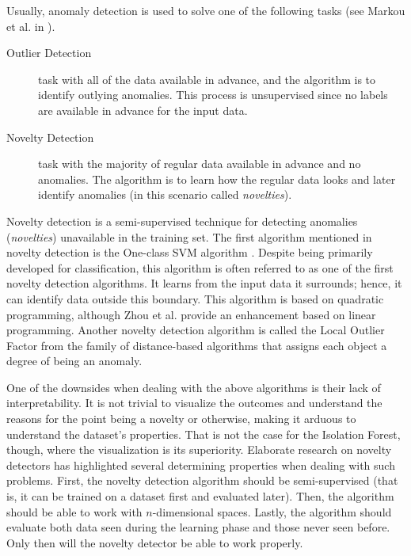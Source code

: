
Usually, anomaly detection is used to solve one of the following tasks (see Markou et al. in \cite{MARKOU20032481}).
\begin{description}
    \item[Outlier Detection]  task with all of the data available in advance, and the algorithm is to identify outlying anomalies. This process is unsupervised since no labels are available in advance for the input data.
    \item[Novelty Detection]  task with the majority of regular data available in advance and no anomalies. The algorithm is to learn how the regular data looks and later identify anomalies (in this scenario called \emph{novelties}).
\end{description}

Novelty detection is a semi-supervised technique for detecting anomalies (\emph{novelties}) unavailable in the training set.
The first algorithm mentioned in novelty detection is the One-class SVM algorithm \cite{tax2004support}. Despite being primarily developed for classification, this algorithm is often referred to as one of the first novelty detection algorithms. It learns from the input data it surrounds; hence, it can identify data outside this boundary.
This algorithm is based on quadratic programming, although Zhou et al. \cite{ZHOU20022927} provide an enhancement based on linear programming.
Another novelty detection algorithm is called the Local Outlier Factor from the family of distance-based algorithms \cite{breunig2000lof} that assigns each object a degree of being an anomaly.



One of the downsides when dealing with the above algorithms is their lack of interpretability. It is not trivial to visualize the outcomes and understand the reasons for the point being a novelty or otherwise, making it arduous to understand the dataset's properties. That is not the case for the Isolation Forest, though, where the visualization is its superiority.
Elaborate research on novelty detectors has highlighted several determining properties when dealing with such problems. First, the novelty detection algorithm should be semi-supervised (that is, it can be trained on a dataset first and evaluated later). Then, the algorithm should be able to work with \(n\)-dimensional spaces. Lastly, the algorithm should evaluate both data seen during the learning phase and those never seen before. Only then will the novelty detector be able to work properly.

